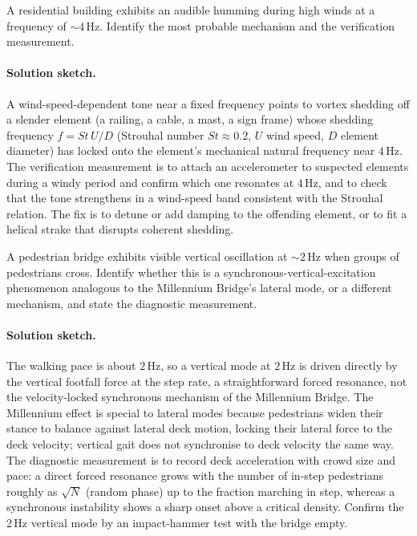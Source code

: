 \begin{exercise}
A residential building exhibits an audible humming during high
winds at a frequency of $\sim 4\,\si{\hertz}$. Identify the most
probable mechanism and the verification measurement.

\paragraph{Solution sketch.} A wind-speed-dependent tone near a fixed
frequency points to vortex shedding off a slender element (a railing,
a cable, a mast, a sign frame) whose shedding frequency $f =
\mathit{St}\,U/D$ (Strouhal number $\mathit{St} \approx 0.2$, $U$ wind
speed, $D$ element diameter) has locked onto the element's mechanical
natural frequency near $4\,\si{\hertz}$. The verification measurement
is to attach an accelerometer to suspected elements during a windy
period and confirm which one resonates at $4\,\si{\hertz}$, and to
check that the tone strengthens in a wind-speed band consistent with
the Strouhal relation. The fix is to detune or add damping to the
offending element, or to fit a helical strake that disrupts coherent
shedding.
\end{exercise}

\begin{exercise}
A pedestrian bridge exhibits visible vertical oscillation at
$\sim 2\,\si{\hertz}$ when groups of pedestrians cross. Identify
whether this is a synchronous-vertical-excitation phenomenon
analogous to the Millennium Bridge's lateral mode, or a different
mechanism, and state the diagnostic measurement.

\paragraph{Solution sketch.} The walking pace is about $2\,\si{
\hertz}$, so a vertical mode at $2\,\si{\hertz}$ is driven directly
by the vertical footfall force at the step rate, a straightforward
forced resonance, not the velocity-locked synchronous mechanism of
the Millennium Bridge. The Millennium effect is special to lateral
modes because pedestrians widen their stance to balance against
lateral deck motion, locking their lateral force to the deck velocity;
vertical gait does not synchronise to deck velocity the same way. The
diagnostic measurement is to record deck acceleration with crowd size
and pace: a direct forced resonance grows with the number of
in-step pedestrians roughly as $\sqrt{N}$ (random phase) up to the
fraction marching in step, whereas a synchronous instability shows a
sharp onset above a critical density. Confirm the $2\,\si{\hertz}$
vertical mode by an impact-hammer test with the bridge empty.
\end{exercise}

